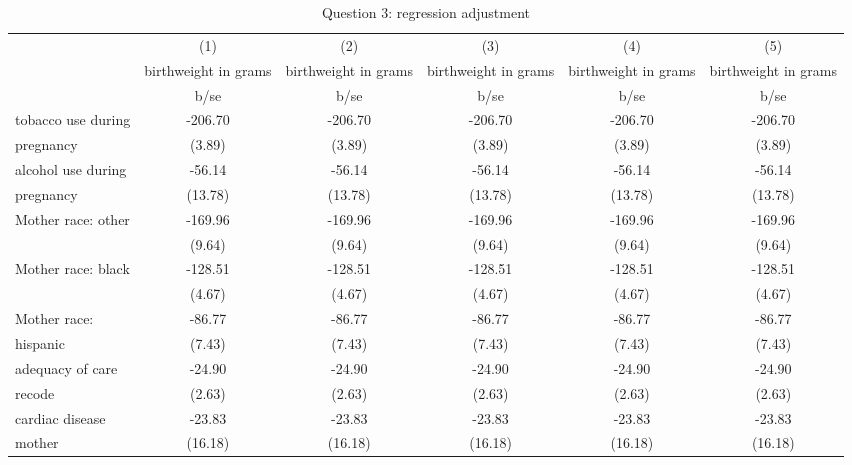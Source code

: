 \begin{table}[htbp]\centering
\def\sym#1{\ifmmode^{#1}\else\(^{#1}\)\fi}
\caption{Question 3: regression adjustment}
\begin{tabular}{l*{5}{c}}
\hline\hline
                    &\multicolumn{1}{c}{(1)}&\multicolumn{1}{c}{(2)}&\multicolumn{1}{c}{(3)}&\multicolumn{1}{c}{(4)}&\multicolumn{1}{c}{(5)}\\
                    &\multicolumn{1}{c}{birthweight in grams}&\multicolumn{1}{c}{birthweight in grams}&\multicolumn{1}{c}{birthweight in grams}&\multicolumn{1}{c}{birthweight in grams}&\multicolumn{1}{c}{birthweight in grams}\\
                    &        b/se&        b/se&        b/se&        b/se&        b/se\\
\hline
tobacco use during  &     -206.70&     -206.70&     -206.70&     -206.70&     -206.70\\
pregnancy           &      (3.89)&      (3.89)&      (3.89)&      (3.89)&      (3.89)\\
alcohol use during  &      -56.14&      -56.14&      -56.14&      -56.14&      -56.14\\
pregnancy           &     (13.78)&     (13.78)&     (13.78)&     (13.78)&     (13.78)\\
Mother race: other  &     -169.96&     -169.96&     -169.96&     -169.96&     -169.96\\
                    &      (9.64)&      (9.64)&      (9.64)&      (9.64)&      (9.64)\\
Mother race: black  &     -128.51&     -128.51&     -128.51&     -128.51&     -128.51\\
                    &      (4.67)&      (4.67)&      (4.67)&      (4.67)&      (4.67)\\
Mother race:        &      -86.77&      -86.77&      -86.77&      -86.77&      -86.77\\
hispanic            &      (7.43)&      (7.43)&      (7.43)&      (7.43)&      (7.43)\\
adequacy of care    &      -24.90&      -24.90&      -24.90&      -24.90&      -24.90\\
recode              &      (2.63)&      (2.63)&      (2.63)&      (2.63)&      (2.63)\\
cardiac disease     &      -23.83&      -23.83&      -23.83&      -23.83&      -23.83\\
mother              &     (16.18)&     (16.18)&     (16.18)&     (16.18)&     (16.18)\\

\end{tabular}
\end{table}
